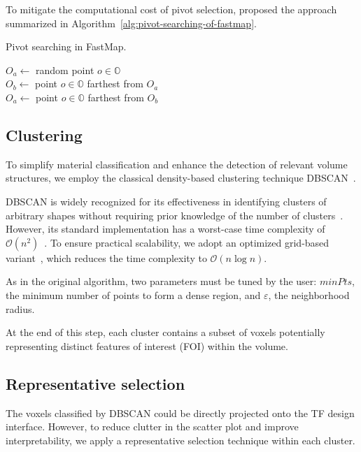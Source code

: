 To mitigate the computational cost of pivot selection, \cite{faloutsos1995} proposed the approach summarized in Algorithm~\ref{alg:pivot-searching-of-fastmap}.

\begin{algorithm}
    \caption{Pivot searching in FastMap.}
    \label{alg:pivot-searching-of-fastmap}
    $O_a \gets$ random point $o \in \mathbb{O}$\\
    $O_b \gets$ point $o \in \mathbb{O}$ farthest from $O_a$\\
    $O_a \gets$ point $o \in \mathbb{O}$ farthest from $O_b$
\end{algorithm}

\subsection{Clustering}
\label{subsect:clustering}

To simplify material classification and enhance the detection of relevant volume structures, we employ the classical density-based clustering technique DBSCAN~\cite{ester1996}.

DBSCAN is widely recognized for its effectiveness in identifying clusters of arbitrary shapes without requiring prior knowledge of the number of clusters~\cite{schubert2017}. However, its standard implementation has a worst-case time complexity of $\mathcal{O}(n^2)$~\cite{schubert2017}. To ensure practical scalability, we adopt an optimized grid-based variant~\cite{gunawan2013}, which reduces the time complexity to $\mathcal{O}(n \log n)$.

As in the original algorithm, two parameters must be tuned by the user: $minPts$, the minimum number of points to form a dense region, and $\varepsilon$, the neighborhood radius.

At the end of this step, each cluster contains a subset of voxels potentially representing distinct features of interest (FOI) within the volume.

\subsection{Representative selection}
\label{subsect:representative-selection}

The voxels classified by DBSCAN could be directly projected onto the TF design interface. However, to reduce clutter in the scatter plot and improve interpretability, we apply a representative selection technique within each cluster.


